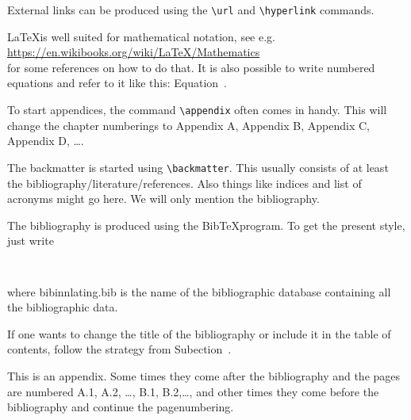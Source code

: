 
External links can be produced using the \texttt{\textbackslash url} and \texttt{\textbackslash hyperlink} commands. 


\LaTeX is well suited for mathematical notation, see e.g.\\ \url{https://en.wikibooks.org/wiki/LaTeX/Mathematics}\\
for some references on how to do that. 
It is also possible to write numbered equations
and refer to it like this: Equation~\MISSINGCOMMAND. 


To start appendices, the command \texttt{\textbackslash appendix} often comes in handy. This will change the chapter numberings to Appendix A, Appendix B, Appendix C, Appendix D, \ldots.

The backmatter is started using \texttt{\textbackslash backmatter}. This usually consists of at least the bibliography/literature/references. Also things like indices and list of acronyms might go here. We will only mention the bibliography. 

The bibliography is produced using the Bib\TeX program. To get the present style, just write 
\begin{verbatim}


\end{verbatim}
where bibinnlating.bib is the name of the bibliographic database containing all the bibliographic data. 

If one wants to change the title of the bibliography or include it in the table of contents, follow the strategy from Subection~\MISSINGCOMMAND.

This is an appendix. Some times they come after the bibliography and the pages are numbered A.1, A.2, \ldots, B.1, B.2,\ldots, and other times they come before the bibliography and continue the pagenumbering. 

